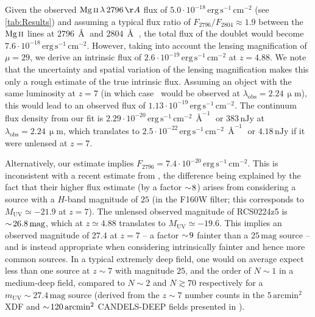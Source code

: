 Given the observed $\MgII \, \lambda \, 2796 \, \Angstrom$ flux of $5.0 \cdot 10^{-18} \, \mathrm{erg \, s^{-1} \, cm^{-2}}$ (see \cref{tab:Results}) and assuming a typical flux ratio of $F_{2796}/F_{2804} \approx 1.9$ between the $\MgII$ lines at $2796 \, \Angstrom$ and $2804 \, \Angstrom$ \citep[e.g.][]{2018ApJ...855...96H}, the total flux of the doublet would become $7.6 \cdot 10^{-18} \, \mathrm{erg \, s^{-1} \, cm^{-2}}$. However, taking into account the lensing magnification of $\mu = 29$, we derive an intrinsic flux of $2.6 \cdot 10^{-19} \, \mathrm{erg \, s^{-1} \, cm^{-2}}$ at $z=4.88$. We note that the uncertainty and spatial variation of the lensing magnification makes this only a rough estimate of the true intrinsic flux. Assuming an object with the same luminosity at $z = 7$ (in which case \MgII\ would be observed at $\lambda_\text{obs} = 2.24 \, \mathrm{\upmu m}$), this would lead to an observed flux of $1.13 \cdot 10^{-19} \, \mathrm{erg \, s^{-1} \, cm^{-2}}$. The continuum flux density from our fit is $2.29 \cdot 10^{-20} \, \mathrm{erg \, s^{-1} \, cm^{-2} \, \Angstrom^{-1}}$ or $383 \, \mathrm{nJy}$ at $\lambda_\text{obs} = 2.24 \, \mathrm{\upmu m}$, which translates to $2.5 \cdot 10^{-22} \, \mathrm{erg \, s^{-1} \, cm^{-2} \, \Angstrom^{-1}}$ or $4.18 \, \mathrm{nJy}$ if it were unlensed at $z=7$.

Alternatively, our estimate implies $F_{2796} = 7.4 \cdot 10^{-20} \, \mathrm{erg \, s^{-1} \, cm^{-2}}$. This is inconsistent with a recent estimate from \citet{2020MNRAS.498.2554C}, the difference being explained by the fact that their higher flux estimate (by a factor $\sim \! 8$) arises from considering a source with a $H$-band magnitude of $25$ (in the F160W filter; this corresponds to $M_\mathrm{UV} \simeq -21.9$ at $z=7$). The unlensed observed magnitude of RCS0224z5 is $\sim \! 26.8 \, \mathrm{mag}$, which at $z \simeq 4.88$ translates to $M_\mathrm{UV} \simeq -19.6$. This implies an observed magnitude of $27.4$ at $z=7$ -- a factor $\sim \! 9$ fainter than a $25 \, \mathrm{mag}$ source -- and is instead appropriate when considering intrinsically fainter and hence more common sources. In a typical extremely deep field, one would on average expect less than one source at $z \sim 7$ with magnitude $25$, and the order of $N \sim 1$ in a medium-deep field, compared to $N \sim 2$ and $N \gtrsim 70$ respectively for a $m_\text{UV} \sim 27.4 \, \mathrm{mag}$ source (derived from the $z \sim 7$ number counts in the $5 \, \mathrm{arcmin^2}$ XDF and $\sim \! 120 \, \mathrm{arcmin^2}$ CANDELS-DEEP fields presented in \citealt{2015ApJ...803...34B}).


